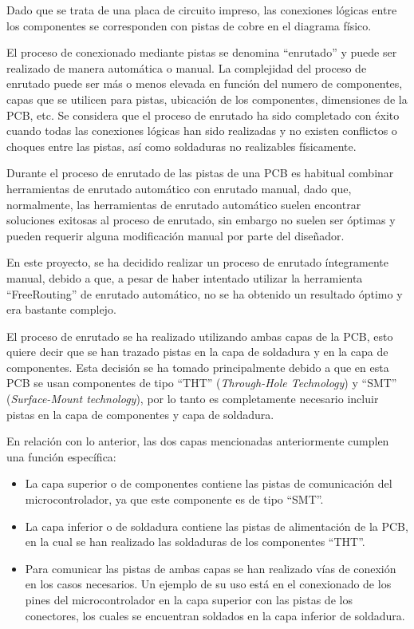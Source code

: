 Dado que se trata de una placa de circuito impreso, las conexiones lógicas entre los componentes se corresponden con pistas de cobre en el diagrama físico.

El proceso de conexionado mediante pistas se denomina ``enrutado'' y puede ser realizado de manera automática o manual. La complejidad del proceso de enrutado puede ser más o menos elevada en función del numero de componentes, capas que se utilicen para pistas, ubicación de los componentes, dimensiones de la \ac{PCB}, etc. Se considera que el proceso de enrutado ha sido completado con éxito cuando todas las conexiones lógicas han sido realizadas y no existen conflictos o choques entre las pistas, así como soldaduras no realizables físicamente.

Durante el proceso de enrutado de las pistas de una \ac{PCB} es habitual combinar herramientas de enrutado automático con enrutado manual, dado que, normalmente, las herramientas de enrutado automático suelen encontrar soluciones exitosas al proceso de enrutado, sin embargo no suelen ser óptimas y pueden requerir alguna modificación manual por parte del diseñador. 

En este proyecto, se ha decidido realizar un proceso de enrutado íntegramente manual, debido a que, a pesar de haber intentado utilizar la herramienta ``FreeRouting'' de enrutado automático, no se ha obtenido un resultado óptimo y era bastante complejo.

El proceso de enrutado se ha realizado utilizando ambas capas de la \ac{PCB}, esto quiere decir que se han trazado pistas en la capa de soldadura y en la capa de componentes. Esta decisión se ha tomado principalmente debido a que en esta \ac{PCB} se usan componentes de tipo ``\ac{THT}'' (\textit{Through-Hole Technology}) y ``SMT'' (\textit{Surface-Mount technology}), por lo tanto es completamente necesario incluir pistas en la capa de componentes y capa de soldadura.

En relación con lo anterior, las dos capas mencionadas anteriormente cumplen una función específica:
\begin{itemize}
    \item La capa superior o de componentes contiene las pistas de comunicación del microcontrolador, ya que este componente es de tipo ``SMT''.
    \item La capa inferior o de soldadura contiene las pistas de alimentación de la \ac{PCB}, en la cual se han realizado las soldaduras de los componentes ``\ac{THT}''.
    \item Para comunicar las pistas de ambas capas se han realizado vías de conexión en los casos necesarios. Un ejemplo de su uso está en el conexionado de los pines del microcontrolador en la capa superior con las pistas de los conectores, los cuales se encuentran soldados en la capa inferior de soldadura.
\end{itemize}

